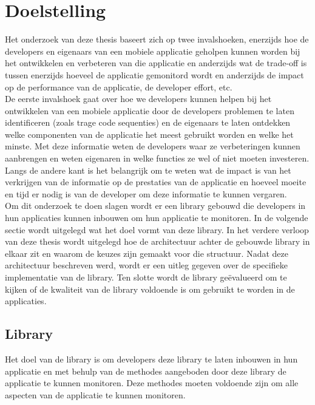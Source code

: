 \chapter{Doelstelling} \label{doelstelling}
Het onderzoek van deze thesis baseert zich op twee invalshoeken, enerzijds hoe de developers en eigenaars van een mobiele applicatie geholpen kunnen worden bij het ontwikkelen en verbeteren van die applicatie en anderzijds wat de trade-off is tussen enerzijds hoeveel de applicatie gemonitord wordt en anderzijds de impact op de performance van de applicatie, de developer effort, etc. \\

De eerste invalshoek gaat over hoe we developers kunnen helpen bij het ontwikkelen van een mobiele applicatie door de developers problemen te laten identificeren (zoals trage code sequenties) en de eigenaars te laten ontdekken welke componenten van de applicatie het meest gebruikt worden en welke het minste. Met deze informatie weten de developers waar ze verbeteringen kunnen aanbrengen en weten eigenaren in welke functies ze wel of niet moeten investeren. Langs de andere kant is het belangrijk om te weten wat de impact is van het verkrijgen van de informatie op de prestaties van de applicatie en hoeveel moeite en tijd er nodig is van de developer om deze informatie te kunnen vergaren.\\


Om dit onderzoek te doen slagen wordt er een library gebouwd die developers in hun applicaties kunnen inbouwen om hun applicatie te monitoren. In de volgende sectie wordt uitgelegd wat het doel vormt van deze library. In het verdere verloop van deze thesis wordt uitgelegd hoe de architectuur achter de gebouwde library in elkaar zit en waarom de keuzes zijn gemaakt voor die structuur. Nadat deze architectuur beschreven werd, wordt er een uitleg gegeven over de specifieke implementatie van de library. Ten slotte wordt de library ge\"evalueerd om te kijken of de kwaliteit van de library voldoende is om gebruikt te worden in de applicaties. 

\section{Library}
Het doel van de library is om developers deze library te laten inbouwen in hun applicatie en met behulp van de methodes aangeboden door deze library de applicatie te kunnen monitoren. Deze methodes moeten voldoende zijn om alle aspecten van de applicatie te kunnen monitoren. \\

